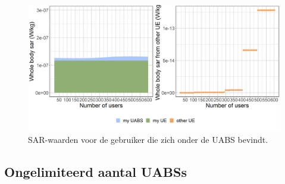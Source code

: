\documentclass[twocolumn]{phdsymp} %
\begin{document}
\begin{figure}[h]
\centering
  \includegraphics[width=0.9\linewidth]{../results/s2/uvsulsarcentralUser.png}
  \caption{SAR-waarden voor de gebruiker die zich onder de \acs{UABS} bevindt.}
  \label{fig:uvsulsarcentralUsers}
\end{figure}

\FloatBarrier
\subsection{Ongelimiteerd aantal \gls{UABS}s}
\end{document}
